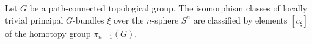 Let $G$ be a path-connected topological group. The isomorphism classes of locally trivial principal $G$-bundles $\xi$ over the $n$-sphere $S^n$ are classified by elements $[c_\xi]$ of the homotopy group $\pi_{n-1}(G)$.
